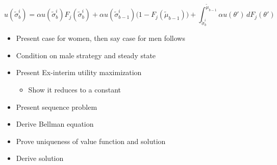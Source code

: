 \begin{equation}
    u(\widetilde \sigma^i_b) = \alpha u(\widetilde \sigma^i_b) F_j(\widetilde \sigma^i_b) + \alpha u(\widetilde \sigma^i_{b-1})\Big(1- F_j(\widetilde \mu_{b-1})\Big)+\int^{\widetilde \mu_{b-1}}_{\widetilde \sigma^i_b} \alpha u(\theta')\,dF_j(\theta')
\end{equation} 


\begin{itemize}
    \item Present case for women, then say case for men follows
    \item Condition on male strategy and steady state
    \item Present Ex-interim utility maximization
    \begin{itemize}
        \item Show it reduces to a constant
    \end{itemize} 
    \item Present sequence problem
    \item Derive Bellman equation
    \item Prove uniqueness of value function and solution
    \item Derive solution
\end{itemize}